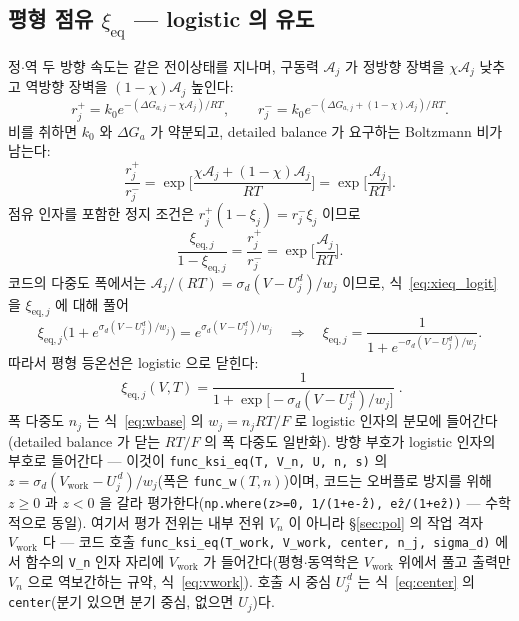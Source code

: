 \documentclass[11pt,a4paper]{article}
\newcommand{\eq}{\mathrm{eq}}
\newcommand{\work}{\mathrm{work}}
\newcommand{\code}[1]{\texttt{#1}}
\begin{document}
\subsection{평형 점유 $\xi_\eq$ — logistic 의 유도}
정$\cdot$역 두 방향 속도는 같은 전이상태를 지나며, 구동력 $\mathcal A_j$ 가 정방향 장벽을 $\chi\mathcal A_j$ 낮추고
역방향 장벽을 $(1-\chi)\mathcal A_j$ 높인다:
\begin{equation}
r_j^+=k_0e^{-(\Delta G_{a,j}-\chi\mathcal A_j)/RT},\qquad
r_j^-=k_0e^{-(\Delta G_{a,j}+(1-\chi)\mathcal A_j)/RT}.
\label{eq:xieq_rates}
\end{equation}
비를 취하면 $k_0$ 와 $\Delta G_a$ 가 약분되고, detailed balance 가 요구하는 Boltzmann 비가 남는다:
\begin{equation}
\frac{r_j^+}{r_j^-}
=\exp\!\Big[\frac{\chi\mathcal A_j+(1-\chi)\mathcal A_j}{RT}\Big]
=\exp\!\Big[\frac{\mathcal A_j}{RT}\Big].
\label{eq:xieq_db}
\end{equation}
점유 인자를 포함한 정지 조건은 $r_j^+(1-\xi_j)=r_j^-\xi_j$ 이므로
\begin{equation}
\frac{\xi_{\eq,j}}{1-\xi_{\eq,j}}
=\frac{r_j^+}{r_j^-}
=\exp\!\Big[\frac{\mathcal A_j}{RT}\Big].
\label{eq:xieq_logit}
\end{equation}
코드의 다중도 폭에서는 $\mathcal A_j/(RT)=\sigma_d(V-U_j^d)/w_j$ 이므로, 식~\eqref{eq:xieq_logit} 을 $\xi_{\eq,j}$ 에 대해 풀어
\begin{equation}
\xi_{\eq,j}\big(1+e^{\sigma_d(V-U_j^d)/w_j}\big)
=e^{\sigma_d(V-U_j^d)/w_j}
\quad\Longrightarrow\quad
\xi_{\eq,j}=\frac{1}{1+e^{-\sigma_d(V-U_j^d)/w_j}}.
\label{eq:xieq_solve}
\end{equation}
따라서 평형 등온선은 logistic 으로 닫힌다:
\begin{equation}
\boxed{\;\xi_{\eq,j}(V,T)=\frac{1}{1+\exp\!\big[-\sigma_d(V-U_j^{\,d})/w_j\big]}\;.}
\label{eq:xieq}
\end{equation}
폭 다중도 $n_j$ 는 식~\eqref{eq:wbase} 의 $w_j=n_jRT/F$ 로 logistic 인자의 분모에 들어간다(detailed balance 가 닫는 $RT/F$ 의 폭 다중도 일반화). 방향 부호가 logistic 인자의 부호로 들어간다 — 이것이 \code{func\_ksi\_eq(T, V\_n, U, n, s)} 의
$z=\sigma_d(V_\work-U_j^{\,d})/w_j$(폭은 \code{func\_w}$(T,n)$)이며, 코드는 오버플로 방지를 위해 $z\ge0$ 과 $z<0$ 을
갈라 평가한다(\code{np.where(z>=0, 1/(1+e\^{-z}), e\^{z}/(1+e\^{z}))} — 수학적으로 동일). 여기서 평가 전위는
내부 전위 $V_n$ 이 아니라 \S\ref{sec:pol} 의 작업 격자 $V_\work$ 다 — 코드 호출 \code{func\_ksi\_eq(T\_work,
V\_work, center, n\_j, sigma\_d)} 에서 함수의 \code{V\_n} 인자 자리에 $V_\work$ 가 들어간다(평형$\cdot$동역학은
$V_\work$ 위에서 풀고 출력만 $V_n$ 으로 역보간하는 규약, 식~\eqref{eq:vwork}). 호출 시 중심 $U_j^{\,d}$ 는
식~\eqref{eq:center} 의 \code{center}(분기 있으면 분기 중심, 없으면 $U_j$)다.
\end{document}
